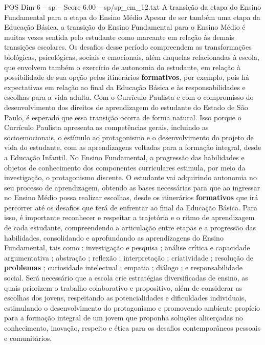 \begin{textsample}{POS Dim 6 – sp – Score 6.00 – sp/sp\_em\_12.txt}  \label{ex:f6_pos_090}
A transição da etapa do Ensino Fundamental para a etapa do Ensino Médio Apesar de ser também uma etapa da Educação Básica, a transição do Ensino Fundamental para o Ensino Médio é muitas vezes sentida pelo estudante como marcante em relação às demais transições escolares.
Os desafios desse período compreendem as transformações biológicas, psicológicas, sociais e emocionais, além daquelas relacionadas à escola, que envolvem também o exercício de autonomia do estudante, em relação à possibilidade de sua opção pelos itinerários \textbf{formativos}, por exemplo, pois há expectativas em relação ao final da Educação Básica e às responsabilidades e escolhas para a vida adulta.
Com o Currículo Paulista e com o compromisso do desenvolvimento dos direitos de aprendizagem do estudante do Estado de São Paulo, é esperado que essa transição ocorra de forma natural.
Isso porque o Currículo Paulista apresenta as competências gerais, incluindo as socioemocionais, o estímulo ao protagonismo e o desenvolvimento do projeto de vida do estudante, com as aprendizagens voltadas para a formação integral, desde a Educação Infantil.
No Ensino Fundamental, a progressão das habilidades e objetos de conhecimento dos componentes curriculares estimula, por meio da investigação, o protagonismo discente.
O estudante vai adquirindo autonomia no seu processo de aprendizagem, obtendo as bases necessárias para que ao ingressar no Ensino Médio possa realizar escolhas, desde os itinerários \textbf{formativos} que irá percorrer até os desafios que terá de enfrentar ao final da Educação Básica.
Para isso, é importante reconhecer e respeitar a trajetória e o ritmo de aprendizagem de cada estudante, compreendendo a articulação entre etapas e a progressão das habilidades, consolidando e aprofundando as aprendizagens do Ensino Fundamental, tais como : investigação e pesquisa ; análise crítica e capacidade argumentativa ; abstração ; reflexão ; interpretação ; criatividade ; resolução de \textbf{problemas} ; curiosidade intelectual ; empatia ; diálogo ; e responsabilidade social.
Será necessário que a escola crie estratégias diversificadas de ensino, as quais priorizem o trabalho colaborativo e propositivo, além de considerar as escolhas dos jovens, respeitando as potencialidades e dificuldades individuais, estimulando o desenvolvimento do protagonismo e promovendo ambiente propício para a formação integral de um jovem que proponha soluções alicerçadas no conhecimento, inovação, respeito e ética para os desafios contemporâneos pessoais e comunitários.

\end{textsample}
